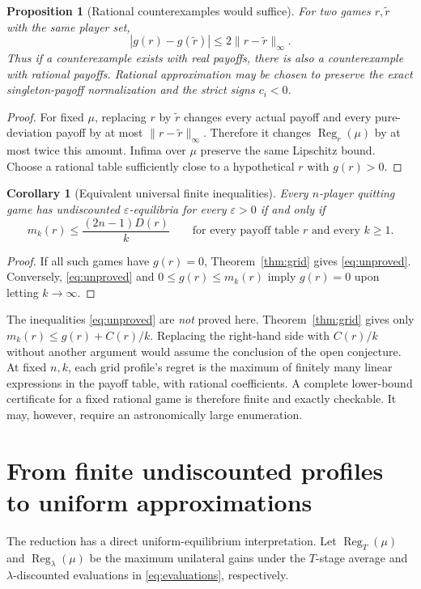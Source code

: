 \documentclass[11pt,a4paper]{article}
\numberwithin{equation}{section}
\theoremstyle{plain}
\newtheorem{proposition}[theorem]{Proposition}
\newtheorem{corollary}[theorem]{Corollary}
\theoremstyle{definition}
\theoremstyle{remark}
\newcommand{\Reg}{\operatorname{Reg}}
\newcommand{\eps}{\varepsilon}
\begin{document}
\begin{proposition}[Rational counterexamples would suffice]\label{prop:lipschitz}
For two games $r,\widetilde r$ with the same player set,
\begin{equation}\label{eq:Lipschitz}
 |g(r)-g(\widetilde r)|\le2\|r-\widetilde r\|_\infty.
\end{equation}
Thus if a counterexample exists with real payoffs, there is also a
counterexample with rational payoffs. Rational approximation may be
chosen to preserve the exact singleton-payoff normalization and the
strict signs $c_i<0$.
\end{proposition}
\begin{proof}
For fixed $\mu$, replacing $r$ by $\widetilde r$ changes every
actual payoff and every pure-deviation payoff by at most
$\|r-\widetilde r\|_\infty$. Therefore it changes
$\Reg_r(\mu)$ by at most twice this amount. Infima over $\mu$
preserve the same Lipschitz bound. Choose a rational table sufficiently
close to a hypothetical $r$ with $g(r)>0$.
\end{proof}

\begin{corollary}[Equivalent universal finite inequalities]\label{cor:positive}
Every $n$-player quitting game has undiscounted $\eps$-equilibria
for every $\eps>0$ if and only if
\begin{equation}\label{eq:unproved}
 m_k(r)\le\frac{(2n-1)D(r)}k
 \qquad\text{for every payoff table $r$ and every }k\ge1.
\end{equation}
\end{corollary}
\begin{proof}
If all such games have $g(r)=0$, Theorem~\ref{thm:grid} gives
\eqref{eq:unproved}. Conversely, \eqref{eq:unproved} and
$0\le g(r)\le m_k(r)$ imply $g(r)=0$ upon letting $k\to\infty$.
\end{proof}

The inequalities \eqref{eq:unproved} are \emph{not} proved here.
Theorem~\ref{thm:grid} gives only
$m_k(r)\le g(r)+C(r)/k$. Replacing the right-hand side with
$C(r)/k$ without another argument would assume the conclusion of
the open conjecture. At fixed $n,k$, each grid profile's regret is the
maximum of finitely many linear expressions in the payoff table,
with rational coefficients. A complete lower-bound certificate for a
fixed rational game is therefore finite and exactly checkable. It
may, however, require an astronomically large enumeration.

\section{From finite undiscounted profiles to uniform approximations}\label{sec:uniform}
The reduction has a direct uniform-equilibrium interpretation.
Let $\Reg_T(\mu)$ and $\Reg_\lambda(\mu)$ be the maximum unilateral
gains under the $T$-stage average and $\lambda$-discounted evaluations
in \eqref{eq:evaluations}, respectively.
\end{document}
